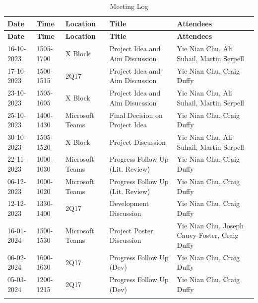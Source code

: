 \newpage
\begin{landscape}
\setcounter{figure}{0}
\setcounter{table}{0} 
\begin{longtable}{ |m{2.5cm}|m{2.5cm}|m{2cm}|m{6.5cm}|m{8cm}| }
    \hline
    \rowcolor{lightgray}
    \textbf{Date} & \textbf{Time} & \textbf{Location} & \textbf{Title} & \textbf{Attendees} \\
    \hline
    \endfirsthead

    \hline
    \rowcolor{lightgray}
    \textbf{Date} & \textbf{Time} & \textbf{Location} & \textbf{Title} & \textbf{Attendees} \\
    \hline
    \endhead
    16-10-2023 & 1505-1700 & X Block & Project Idea and Aim Discussion & Yie Nian Chu, Ali Suhail, Martin Serpell \\
    \hline
    17-10-2023 & 1500-1515 & 2Q17 & Project Idea and Aim Discussion & Yie Nian Chu, Craig Duffy \\
    \hline
    23-10-2023 & 1505-1605 & X Block & Project Idea and Aim Disucssion & Yie Nian Chu, Ali Suhail, Martin Serpell \\
    \hline
    25-10-2023 & 1400-1430 & Microsoft Teams & Final Decision on Project Idea & Yie Nian Chu, Craig Duffy \\
    \hline
    30-10-2023 & 1505-1520 & X Block & Project Discussion & Yie Nian Chu, Ali Suhail, Martin Serpell \\
    \hline
    22-11-2023 & 1000-1030 & Microsoft Teams & Progress Follow Up (Lit. Review) & Yie Nian Chu, Craig Duffy \\
    \hline
    06-12-2023 & 1000-1020 & Microsoft Teams & Progress Follow Up (Lit. Review) & Yie Nian Chu, Craig Duffy \\
    \hline
    12-12-2023 & 1330-1400 & 2Q17 & Development Discussion & Yie Nian Chu, Craig Duffy \\
    \hline
    16-01-2024 & 1500-1530 & Microsoft Teams & Project Poster Discussion & Yie Nian Chu, Joseph Cauvy-Foster, Craig Duffy \\
    \hline
    06-02-2024 & 1600-1630 & 2Q17 & Progress Follow Up (Dev) & Yie Nian Chu, Craig Duffy \\
    \hline
    05-03-2024 & 1200-1215 & 2Q17 & Progress Follow Up (Dev) & Yie Nian Chu, Craig Duffy \\
    \hline
    \caption{Meeting Log}
    \label{tab:meeting-log}
\end{longtable}
\end{landscape}

